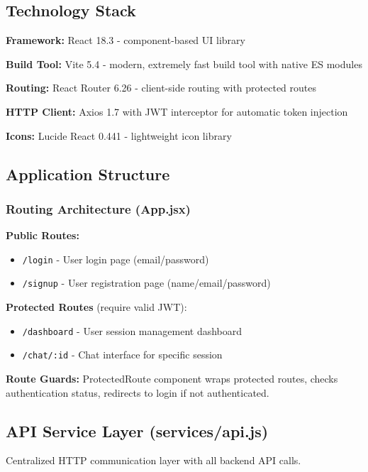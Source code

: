 \documentclass[12pt,a4paper]{article}
\begin{document}
\subsection{Technology Stack}

\textbf{Framework:} React 18.3 - component-based UI library

\textbf{Build Tool:} Vite 5.4 - modern, extremely fast build tool with native ES modules

\textbf{Routing:} React Router 6.26 - client-side routing with protected routes

\textbf{HTTP Client:} Axios 1.7 with JWT interceptor for automatic token injection

\textbf{Icons:} Lucide React 0.441 - lightweight icon library

\subsection{Application Structure}

\subsubsection{Routing Architecture (App.jsx)}

\textbf{Public Routes:}
\begin{itemize}
    \item \texttt{/login} - User login page (email/password)
    \item \texttt{/signup} - User registration page (name/email/password)
\end{itemize}

\textbf{Protected Routes} (require valid JWT):
\begin{itemize}
    \item \texttt{/dashboard} - User session management dashboard
    \item \texttt{/chat/:id} - Chat interface for specific session
\end{itemize}

\textbf{Route Guards:} ProtectedRoute component wraps protected routes, checks authentication status, redirects to login if not authenticated.

\subsection{API Service Layer (services/api.js)}

Centralized HTTP communication layer with all backend API calls.
\end{document}
